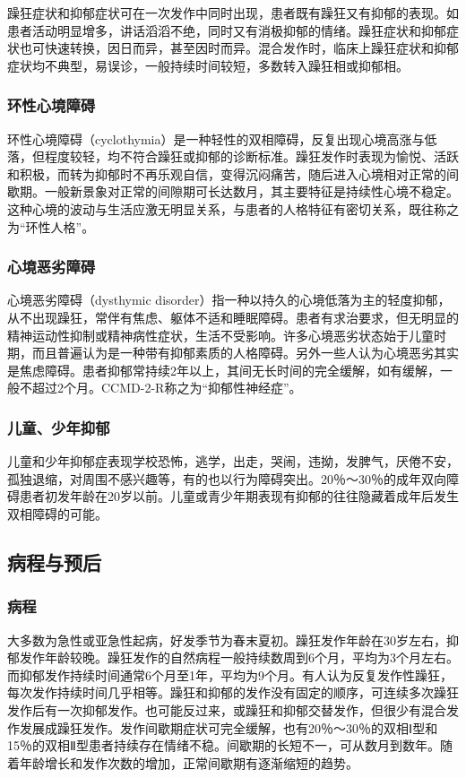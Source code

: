 躁狂症状和抑郁症状可在一次发作中同时出现，患者既有躁狂又有抑郁的表现。如患者活动明显增多，讲话滔滔不绝，同时又有消极抑郁的情绪。躁狂症状和抑郁症状也可快速转换，因日而异，甚至因时而异。混合发作时，临床上躁狂症状和抑郁症状均不典型，易误诊，一般持续时间较短，多数转入躁狂相或抑郁相。

\subsubsection{环性心境障碍}

环性心境障碍（cyclothymia）是一种轻性的双相障碍，反复出现心境高涨与低落，但程度较轻，均不符合躁狂或抑郁的诊断标准。躁狂发作时表现为愉悦、活跃和积极，而转为抑郁时不再乐观自信，变得沉闷痛苦，随后进入心境相对正常的间歇期。一般新景象对正常的间隙期可长达数月，其主要特征是持续性心境不稳定。这种心境的波动与生活应激无明显关系，与患者的人格特征有密切关系，既往称之为“环性人格”。

\subsubsection{心境恶劣障碍}

心境恶劣障碍（dysthymic
disorder）指一种以持久的心境低落为主的轻度抑郁，从不出现躁狂，常伴有焦虑、躯体不适和睡眠障碍。患者有求治要求，但无明显的精神运动性抑制或精神病性症状，生活不受影响。许多心境恶劣状态始于儿童时期，而且普遍认为是一种带有抑郁素质的人格障碍。另外一些人认为心境恶劣其实是焦虑障碍。患者抑郁常持续2年以上，其间无长时间的完全缓解，如有缓解，一般不超过2个月。CCMD-2-R称之为“抑郁性神经症”。

\subsubsection{儿童、少年抑郁}

儿童和少年抑郁症表现学校恐怖，逃学，出走，哭闹，违拗，发脾气，厌倦不安，孤独退缩，对周围不感兴趣等，有的也以行为障碍突出。20％～30％的成年双向障碍患者初发年龄在20岁以前。儿童或青少年期表现有抑郁的往往隐藏着成年后发生双相障碍的可能。

\subsection{病程与预后}

\subsubsection{病程}

大多数为急性或亚急性起病，好发季节为春末夏初。躁狂发作年龄在30岁左右，抑郁发作年龄较晚。躁狂发作的自然病程一般持续数周到6个月，平均为3个月左右。而抑郁发作持续时间通常6个月至1年，平均为9个月。有人认为反复发作性躁狂，每次发作持续时间几乎相等。躁狂和抑郁的发作没有固定的顺序，可连续多次躁狂发作后有一次抑郁发作。也可能反过来，或躁狂和抑郁交替发作，但很少有混合发作发展成躁狂发作。发作间歇期症状可完全缓解，也有20％～30％的双相Ⅰ型和15％的双相Ⅱ型患者持续存在情绪不稳。间歇期的长短不一，可从数月到数年。随着年龄增长和发作次数的增加，正常间歇期有逐渐缩短的趋势。

